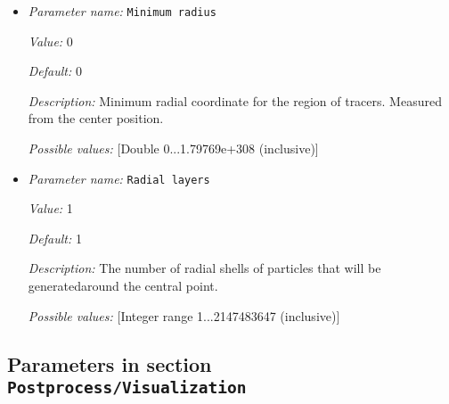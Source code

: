 \begin{itemize}
{\it Possible values:} [Double 0...360 (inclusive)]
\item {\it Parameter name:} {\tt Minimum radius}
\label{parameters:Postprocess/Tracers/Generator/Uniform radial/Minimum radius}


{\it Value:} 0


{\it Default:} 0


{\it Description:} Minimum radial coordinate for the region of tracers. Measured from the center position.


{\it Possible values:} [Double 0...1.79769e+308 (inclusive)]
\item {\it Parameter name:} {\tt Radial layers}
\label{parameters:Postprocess/Tracers/Generator/Uniform radial/Radial layers}


{\it Value:} 1


{\it Default:} 1


{\it Description:} The number of radial shells of particles that will be generatedaround the central point.


{\it Possible values:} [Integer range 1...2147483647 (inclusive)]
\end{itemize}

\subsection{Parameters in section \tt Postprocess/Visualization}
\label{parameters:Postprocess/Visualization}

